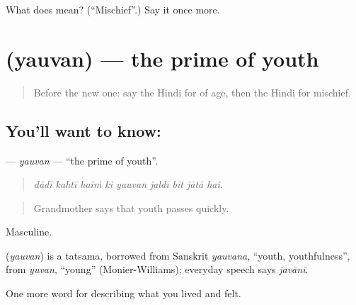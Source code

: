 \begin{tcolorbox}[breakable,colback=teal!4,colframe=teal!35!black,title={Before you move on}]
What does  mean? (\textquotedblleft{}Mischief\textquotedblright{}.) Say it once more.
\end{tcolorbox}
\section[\texorpdfstring{\hi{यौवन} (yauvan)}{यौवन (yauvan)}]{ (yauvan) — the prime of youth}

\label{lesson:HI-C499-yauvan}



\begin{quote}
Before the new one: say the Hindi for of age, then the Hindi for mischief.
\end{quote}

\subsection*{You'll want to know: }
\textbf{} — \emph{yauvan} — \textquotedblleft{}the prime of youth\textquotedblright{}.

\begin{quote}
        
\end{quote}

\begin{quote}
\emph{dādī kahtī haiṁ ki yauvan jaldī bīt jātā hai.}
\end{quote}

\begin{quote}
Grandmother says that youth passes quickly.
\end{quote}

Masculine.

\begin{cousinweb}
\textbf{} (\emph{yauvan}) is a tatsama, borrowed from Sanskrit \emph{yauvana}, \textquotedblleft{}youth, youthfulness\textquotedblright{}, from \emph{yuvan}, \textquotedblleft{}young\textquotedblright{} (Monier-Williams); everyday speech says \emph{javānī}.
\end{cousinweb}

\begin{grammarlens}[title={What you've built}]
One more word for describing what you lived and felt.
\end{grammarlens}

